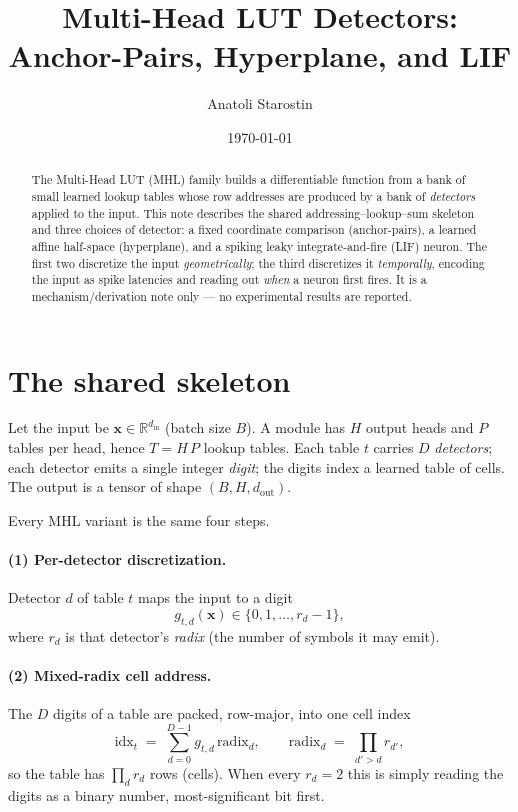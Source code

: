 \documentclass[11pt]{article}
\title{Multi-Head LUT Detectors:\\ Anchor-Pairs, Hyperplane, and LIF}
\author{Anatoli Starostin}
\date{\today}
\newcommand{\R}{\mathbb{R}}
\newcommand{\x}{\mathbf{x}}
\newcommand{\radix}{\mathrm{radix}}
\begin{document}
\maketitle

\begin{abstract}
The Multi-Head LUT (MHL) family builds a differentiable function from a bank of small learned lookup tables
whose row addresses are produced by a bank of \emph{detectors} applied to the input. This note describes the
shared addressing--lookup--sum skeleton and three choices of detector: a fixed coordinate comparison
(anchor-pairs), a learned affine half-space (hyperplane), and a spiking leaky integrate-and-fire (LIF) neuron.
The first two discretize the input \emph{geometrically}; the third discretizes it \emph{temporally}, encoding
the input as spike latencies and reading out \emph{when} a neuron first fires. It is a mechanism/derivation
note only --- no experimental results are reported.
\end{abstract}

\section{The shared skeleton}
\label{sec:skeleton}

Let the input be $\x \in \R^{d_{\mathrm{in}}}$ (batch size $B$). A module has $H$ output heads and $P$ tables
per head, hence $T = H\,P$ lookup tables. Each table $t$ carries $D$ \emph{detectors}; each detector emits a
single integer \emph{digit}; the digits index a learned table of cells. The output is a tensor of shape
$(B, H, d_{\mathrm{out}})$.

Every MHL variant is the same four steps.

\paragraph{(1) Per-detector discretization.} Detector $d$ of table $t$ maps the input to a digit
\begin{equation}
  g_{t,d}(\x) \in \{0, 1, \dots, r_d - 1\},
\end{equation}
where $r_d$ is that detector's \emph{radix} (the number of symbols it may emit).

\paragraph{(2) Mixed-radix cell address.} The $D$ digits of a table are packed, row-major, into one cell index
\begin{equation}
  \mathrm{idx}_t \;=\; \sum_{d=0}^{D-1} g_{t,d}\,\radix_d,
  \qquad
  \radix_d \;=\; \prod_{d' > d} r_{d'} ,
  \label{eq:mixedradix}
\end{equation}
so the table has $\prod_{d} r_d$ rows (cells). When every $r_d = 2$ this is simply reading the digits as a
binary number, most-significant bit first.
\end{document}
